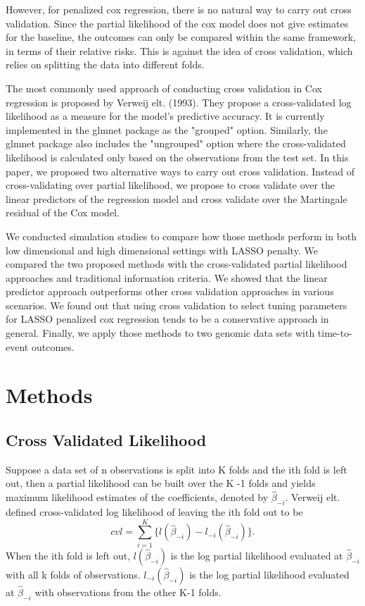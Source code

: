 \documentclass{article}\usepackage[]{graphicx}\usepackage[]{color}
\begin{document}
However, for penalized cox regression, there is no natural way to carry out cross validation. Since the partial likelihood of the cox model does not give estimates for the baseline, the outcomes can only be compared within the same framework, in terms of their relative risks. This is against the idea of cross validation, which relies on splitting the data into different folds.

\par The most commonly used approach of conducting cross validation in Cox regression is proposed by Verweij elt. (1993). They propose a cross-validated log likelihood as a measure for the model's predictive accuracy.  It is currently implemented in the glmnet package as the "grouped" option. Similarly, the glmnet package also includes the "ungrouped" option where the cross-validated likelihood is calculated only based on the observations from the test set. In this paper, we proposed two alternative ways to carry out cross validation. Instead of cross-validating over partial likelihood, we propose to cross validate over the linear predictors of the regression model and cross validate over the Martingale residual of the Cox model. 
\par We conducted simulation studies to compare how those methods perform in both low dimensional and high dimensional settings with LASSO penalty. We compared the two proposed methods with the cross-validated partial likelihood approaches and traditional information criteria. We showed that the linear predictor approach outperforms other cross validation approaches in various scenarios. We found out that using cross validation to select tuning parameters for LASSO penalized cox regression tends to be a conservative approach in general. Finally, we apply those methods to two genomic data sets with time-to-event outcomes.

\section{Methods}

  \subsection{Cross Validated Likelihood}
  
Suppose a data set of n observations is split into K folds and the ith fold is left out, then a partial likelihood can be built over the K -1 folds and yields maximum likelihood estimates of the coefficients, denoted by $\hat{\beta}_{-i}$. Verweij elt. defined cross-validated log likelihood of leaving the ith fold out to be \begin{equation}cvl = \sum_{i=1}^{K} \{l(\hat{\beta}_{-i}) - l_{-i}(\hat{\beta}_{-i})\}. \end{equation} When the ith fold is left out, $l(\hat{\beta}_{-i})$ is the log partial likelihood evaluated at $\hat{\beta}_{-i}$ with all k folds of observations. $l_{-i}(\hat{\beta}_{-i})$ is the log partial likelihood evaluated at $\hat{\beta}_{-i}$ with observations from the other K-1 folds. 
   
\end{document}
